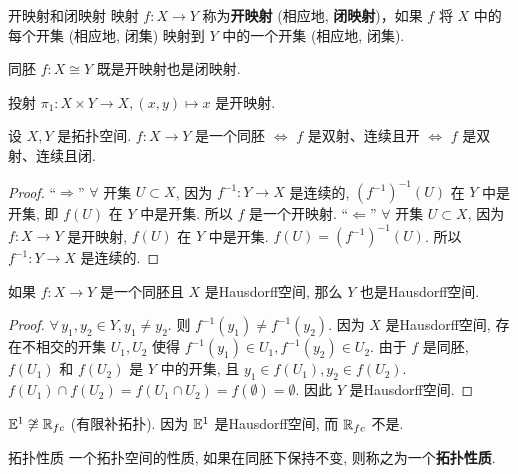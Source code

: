 \begin{definition}{开映射和闭映射}
    映射 $f:X\to Y$ 称为\textbf{开映射} (相应地, \textbf{闭映射})，如果 $f$ 将 $X$ 中的每个开集 (相应地, 闭集) 映射到 $Y$ 中的一个开集 (相应地, 闭集).
\end{definition}

\begin{remark}
    同胚 $f:X\cong Y$ 既是开映射也是闭映射.
\end{remark}

\begin{instance}
    投射 $\pi_1:X\times Y\to X, (x,y)\mapsto x$ 是开映射.
\end{instance}

\begin{proposition}
    设 $X,Y$ 是拓扑空间. $f:X\to Y$ 是一个同胚 $\Leftrightarrow$ $f$ 是双射、连续且开 $\Leftrightarrow$ $f$ 是双射、连续且闭.
\end{proposition}
\begin{proof}
    “$\Rightarrow$” $\forall$ 开集 $U\subset X$, 因为 $f^{-1}:Y\to X$ 是连续的, $(f^{-1})^{-1}(U)$ 在 $Y$ 中是开集, 即 $f(U)$ 在 $Y$ 中是开集. 所以 $f$ 是一个开映射.
    “$\Leftarrow$” $\forall$ 开集 $U\subset X$, 因为 $f:X\to Y$ 是开映射, $f(U)$ 在 $Y$ 中是开集. $f(U)=(f^{-1})^{-1}(U)$. 所以 $f^{-1}:Y\to X$ 是连续的.
\end{proof}

\begin{theorem}
    如果 $f:X\to Y$ 是一个同胚且 $X$ 是Hausdorff空间, 那么 $Y$ 也是Hausdorff空间.
\end{theorem}
\begin{proof}
    $\forall\, y_1,y_2\in Y, y_1\neq y_2$. 则 $f^{-1}(y_1)\neq f^{-1}(y_2)$.
    因为 $X$ 是Hausdorff空间, 存在不相交的开集 $U_1, U_2$ 使得 $f^{-1}(y_1)\in U_1, f^{-1}(y_2)\in U_2$.
    由于 $f$ 是同胚, $f(U_1)$ 和 $f(U_2)$ 是 $Y$ 中的开集, 且 $y_1\in f(U_1), y_2\in f(U_2)$.
    $f(U_1)\cap f(U_2) = f(U_1\cap U_2) = f(\emptyset) = \emptyset$.
    因此 $Y$ 是Hausdorff空间.
\end{proof}

\begin{instance}
    $\mathbb{E}^1\not\cong \mathbb{R}_{fc}$ (有限补拓扑). 因为 $\mathbb{E}^1$ 是Hausdorff空间, 而 $\mathbb{R}_{fc}$ 不是.
\end{instance}

\begin{definition}{拓扑性质}
    一个拓扑空间的性质, 如果在同胚下保持不变, 则称之为一个\textbf{拓扑性质}.
\end{definition}

